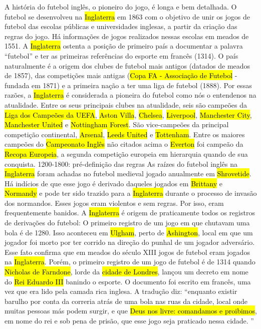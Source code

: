 \documentclass[a4paper,12pt]{article}
\begin{document}
A história do futebol inglês, o pioneiro do jogo, é longa e bem detalhada.
O futebol se desenvolveu na \hl{Inglaterra} em 1863 com o objetivo de unir os jogos de futebol das escolas públicas e universidades inglesas, a partir da criação das regras do jogo.
Há informações de jogos realizados nessas escolas em meados de 1551. A \hl{Inglaterra} ostenta a posição de primeiro país a documentar a palavra “futebol” e ter as primeiras referências do esporte em francês (1314).
O país naturalmente é a origem dos clubes de futebol mais antigos (datados de meados de 1857), das competições mais antigas (\hl{Copa FA - Associação de Futebol} - fundada em 1871) e a primeira nação a ter uma liga de futebol (1888). Por essas razões, a \hl{Inglaterra} é considerada a pioneira do futebol como nós o entendenos na atualidade.
Entre os seus principais clubes na atualidade, seis são campeões da \hl{Liga dos Campeões da UEFA}, \hl{Aston Villa}, \hl{Chelsea}, \hl{Liverpool}, \hl{Manchester City}, \hl{Manchester United} e \hl{Nottingham Forest}.
São vice-campeões da principal competição continental, \hl{Arsenal}, \hl{Leeds United} e \hl{Tottenham}.
Entre os maiores campeões do \hl{Campeonato Inglês} não citados acima o \hl{Everton} foi campeão da \hl{Recopa Europeia}, a segunda competição europeia em hierarquia quando de sua conquista.
1200-1800: pré-definição das regras
As raízes do futebol inglês na \hl{Inglaterra} foram achadas no futebol medieval jogado anualmente em \hl{Shrovetide}. Há indícios de que esse jogo é derivado daqueles jogados em \hl{Brittany} e \hl{Normandy} e pode ter sido trazido para a \hl{Inglaterra} durante o processo de invasão dos normandos. Esses jogos eram violentos e sem regras. Por isso, eram frequentemente banidos.
A \hl{Inglaterra} é origem de praticamente todos os registros de derivações do futebol:
O primeiro registro de um jogo em que chutavam uma bola é de 1280. Isso aconteceu em \hl{Ulgham}, perto de \hl{Ashington}, local em que um jogador foi morto por ter corrido na direção do punhal de um jogador adversário. Esse fato confirma que em meados do século XIII jogos de futebol eram jogados na \hl{Inglaterra}. Porém, o primeiro registro de um jogo de futebol é de 1314 quando \hl{Nicholas de Farndone}, lorde da \hl{cidade de Londres}, lançou um decreto em nome do \hl{Rei Eduardo III} banindo o esporte. O documento foi escrito em francês, uma vez que era lido pela camada rica inglesa. A tradução diz: “enquanto existir barulho por conta da correria atrás de uma bola nas ruas da cidade, local onde muitas pessoas más podem surgir, e que \hl{Deus nos livre: comandamos e proibimos}, em nome do rei e sob pena de prisão, que esse jogo seja praticado nessa cidade. ”
\end{document}

